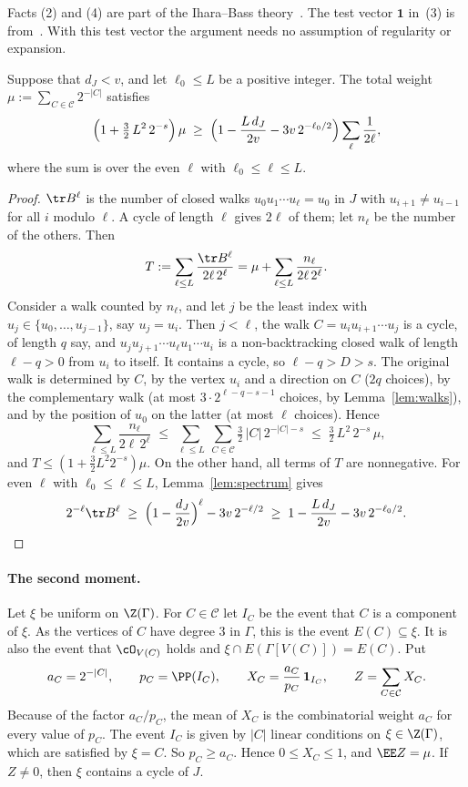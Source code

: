 Facts (2) and (4) are part of the Ihara--Bass theory~\cite{Bass,KS}. The test vector $\mathbf{1}$
in~(3) is from~\cite{KNT}. With this test vector the argument needs no assumption of regularity
or expansion.

\begin{lemma}\label{lem:weight}
Suppose that $d_J<v$, and let $\ell_0\le L$ be a positive integer. The total weight
$\mu:=\sum_{C\in\mathcal{C}}2^{-|C|}$ satisfies
\[
  \Bigl(1+\tfrac32\,L^{2}\,2^{-s}\Bigr)\,\mu\;\ge\;
  \Bigl(1-\frac{L\,d_J}{2v}-3v\,2^{-\ell_0/2}\Bigr)\sum_{\ell}\frac1{2\ell},
\]
where the sum is over the even $\ell$ with $\ell_0\le\ell\le L$.
\end{lemma}

\begin{proof}
$\tr B^{\ell}$ is the number of closed walks $u_0u_1\cdots u_\ell=u_0$ in $J$ with
$u_{i+1}\ne u_{i-1}$ for all $i$ modulo $\ell$. A cycle of length $\ell$ gives $2\ell$ of them; let
$n_\ell$ be the number of the others. Then
\[
  T:=\sum_{\ell\le L}\frac{\tr B^{\ell}}{2\ell\,2^{\ell}}=\mu+\sum_{\ell\le L}\frac{n_\ell}{2\ell\,2^{\ell}} .
\]
Consider a walk counted by $n_\ell$, and let $j$ be the least index with
$u_j\in\{u_0,\dots,u_{j-1}\}$, say $u_j=u_i$. Then $j<\ell$, the walk $C=u_iu_{i+1}\cdots u_j$ is a
cycle, of length $q$ say, and $u_ju_{j+1}\cdots u_\ell u_1\cdots u_i$ is a non-backtracking closed
walk of length $\ell-q>0$ from $u_i$ to itself. It contains a cycle, so $\ell-q>D>s$. The original
walk is determined by $C$, by the vertex $u_i$ and a direction on $C$ ($2q$ choices), by the
complementary walk (at most $3\cdot2^{\ell-q-s-1}$ choices, by Lemma~\ref{lem:walks}), and by the
position of $u_0$ on the latter (at most $\ell$ choices). Hence
\[
  \sum_{\ell\le L}\frac{n_\ell}{2\ell\,2^{\ell}}
  \;\le\;\sum_{\ell\le L}\ \sum_{C\in\mathcal{C}}\tfrac32\,|C|\,2^{-|C|-s}
  \;\le\;\tfrac32\,L^{2}\,2^{-s}\,\mu ,
\]
and $T\le(1+\frac32L^{2}2^{-s})\mu$. On the other hand, all terms of $T$ are nonnegative. For even
$\ell$ with $\ell_0\le\ell\le L$, Lemma~\ref{lem:spectrum} gives
\[
  2^{-\ell}\tr B^{\ell}\;\ge\;\Bigl(1-\frac{d_J}{2v}\Bigr)^{\ell}-3v\,2^{-\ell/2}
  \;\ge\;1-\frac{L\,d_J}{2v}-3v\,2^{-\ell_0/2}.\qedhere
\]
\end{proof}

\paragraph{The second moment.}
Let $\xi$ be uniform on $\Z(\Gamma)$. For $C\in\mathcal{C}$ let $I_C$ be the event that $C$ is a
component of $\xi$. As the vertices of $C$ have degree $3$ in $\Gamma$, this is the event
$E(C)\subseteq\xi$. It is also the event that $\cO_{V(C)}$ holds and
$\xi\cap E(\Gamma[V(C)])=E(C)$. Put
\[
  a_C=2^{-|C|},\qquad p_C=\PP(I_C),\qquad X_C=\frac{a_C}{p_C}\,\mathbf{1}_{I_C},\qquad
  Z=\sum_{C\in\mathcal{C}}X_C .
\]
Because of the factor $a_C/p_C$, the mean of $X_C$ is the combinatorial weight $a_C$ for every
value of $p_C$. The event $I_C$ is given by $|C|$ linear conditions on $\xi\in\Z(\Gamma)$,
which are satisfied by $\xi=C$. So $p_C\ge a_C$. Hence $0\le X_C\le1$, and $\EE Z=\mu$. If
$Z\ne0$, then $\xi$ contains a cycle of $J$.

